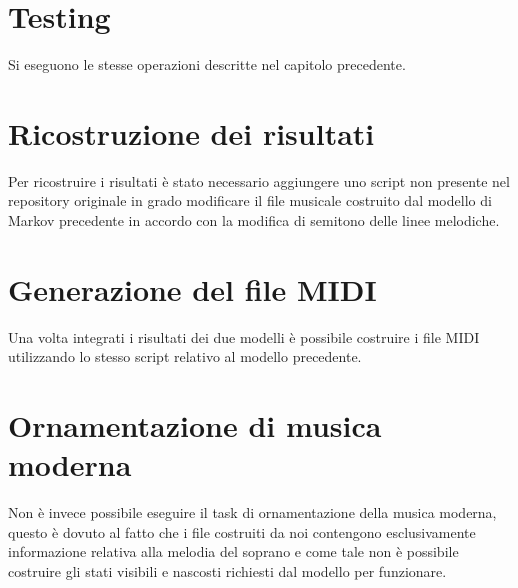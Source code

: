 \section{Testing}
Si eseguono le stesse operazioni descritte nel capitolo precedente.
\section{Ricostruzione dei risultati}
Per ricostruire i risultati è stato necessario aggiungere uno script non presente nel repository originale in grado modificare il file musicale costruito dal modello di Markov precedente in accordo con la modifica di semitono delle linee melodiche.
\section{Generazione del file MIDI}
Una volta integrati i risultati dei due modelli è possibile costruire i file MIDI utilizzando lo stesso script relativo al modello precedente.
\section{Ornamentazione di musica moderna}
Non è invece possibile eseguire il task di ornamentazione della musica moderna, questo è dovuto al fatto che i file costruiti da noi contengono esclusivamente informazione relativa alla melodia del soprano e come tale non è possibile costruire gli stati visibili e nascosti richiesti dal modello per funzionare.
  